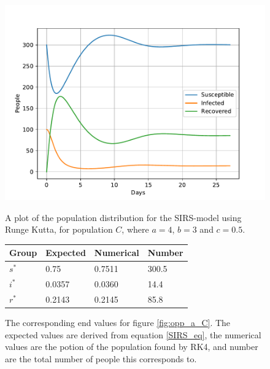 \documentclass[a4paper]{article}
\begin{document}
	\begin{figure}[!htb]
		\centering
		\begin{minipage}{0.49\textwidth}
			\centering
			\includegraphics[scale=0.6]{../plots/opp_a_C.pdf}
			\caption{A plot of the population distribution for the SIRS-model using Runge Kutta, for population $C$, where $a=4$, $b=3$ and $c=0.5$. }\label{fig:opp_a_C}
		\end{minipage}
		\begin{minipage}{0.49\textwidth}
			\centering
			\captionsetup{type=table} %
			\begin{tabular}{|l|l|l|l|}
				\hline
				Group & Expected & Numerical   & Number  \\ \hline
				$s^*$ & 0.75 & 0.7511 & 300.5 \\ \hline
				$i^*$ & 0.0357 & 0.0360 & 14.4 \\ \hline
				$r^*$ & 0.2143 & 0.2145 & 85.8 \\ \hline
			\end{tabular}
			\caption{The corresponding end values for figure \ref{fig:opp_a_C}. The expected values are derived from equation \ref{SIRS_eq}, the numerical values are the potion of the population found by RK4, and number are the total number  of people this corresponds to.}\label{tab:opp_a_C}
		\end{minipage}
	\end{figure}
	
\end{document}
